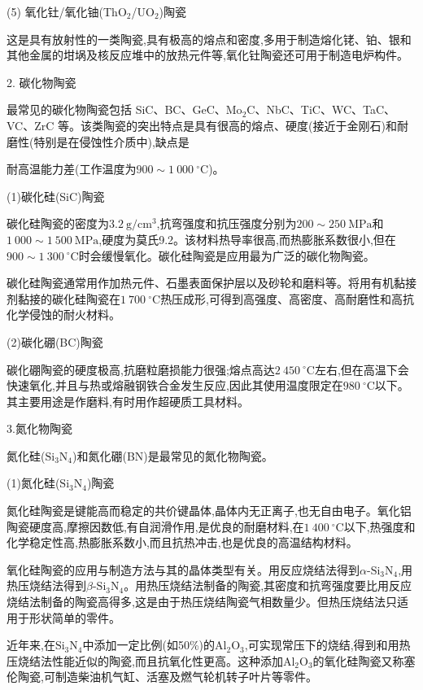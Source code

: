 \documentclass[UTF8]{ctexbook}
\newcommand{\◎}{\ensuremath{\bigcirc}}
\begin{document}
(5) 氧化钍/氧化铀(ThO$_2$/UO$_2$)陶瓷

这是具有放射性的一类陶瓷,具有极高的熔点和密度,多用于制造熔化铑、铂、银和其他金属的坩埚及核反应堆中的放热元件等,氧化钍陶瓷还可用于制造电炉构件。

2. 碳化物陶瓷

最常见的碳化物陶瓷包括 SiC、BC、GeC、Mo$_2$C、NbC、TiC、WC、TaC、VC、ZrC 等。该类陶瓷的突出特点是具有很高的熔点、硬度(接近于金刚石)和耐磨性(特别是在侵蚀性介质中),缺点是

耐高温能力差(工作温度为$900\sim1~000~^\circ\mathrm{C}$)。

(1)碳化硅(SiC)陶瓷

碳化硅陶瓷的密度为$3.2~\mathrm{g/cm^3}$,抗弯强度和抗压强度分别为$200\sim250~\mathrm{MPa}$和$1~000\sim1~500~\mathrm{MPa}$,硬度为莫氏9.2。该材料热导率很高,而热膨胀系数很小,但在$900\sim1~300~^\circ\mathrm{C}$时会缓慢氧化。碳化硅陶瓷是应用最为广泛的碳化物陶瓷。

碳化硅陶瓷通常用作加热元件、石墨表面保护层以及砂轮和磨料等。将用有机黏接剂黏接的碳化硅陶瓷在$1~700~^\circ\mathrm{C}$热压成形,可得到高强度、高密度、高耐磨性和高抗化学侵蚀的耐火材料。

(2)碳化硼(BC)陶瓷

碳化硼陶瓷的硬度极高,抗磨粒磨损能力很强;熔点高达$2~450~^\circ\mathrm{C}$左右,但在高温下会快速氧化,并且与热或熔融钢铁合金发生反应,因此其使用温度限定在$980~^\circ\mathrm{C}$以下。其主要用途是作磨料,有时用作超硬质工具材料。

3.氮化物陶瓷

氮化硅($\mathrm{Si_3N_4}$)和氮化硼(BN)是最常见的氮化物陶瓷。

(1)氮化硅($\mathrm{Si_3N_4}$)陶瓷

氮化硅陶瓷是键能高而稳定的共价键晶体,晶体内无正离子,也无自由电子。氧化铝陶瓷硬度高,摩擦因数低,有自润滑作用,是优良的耐磨材料,在$1~400~^\circ\mathrm{C}$以下,热强度和化学稳定性高,热膨胀系数小,而且抗热冲击,也是优良的高温结构材料。

氧化硅陶瓷的应用与制造方法与其的晶体类型有关。用反应烧结法得到$\alpha\text{-}\mathrm{Si_3N_4}$,用热压烧结法得到$\beta\text{-}\mathrm{Si_3N_4}$。用热压烧结法制备的陶瓷,其密度和抗弯强度要比用反应烧结法制备的陶瓷高得多,这是由于热压烧结陶瓷气相数量少。但热压烧结法只适用于形状简单的零件。

近年来,在$\mathrm{Si_3N_4}$中添加一定比例(如50\%)的$\mathrm{Al_2O_3}$,可实现常压下的烧结,得到和用热压烧结法性能近似的陶瓷,而且抗氧化性更高。这种添加$\mathrm{Al_2O_3}$的氧化硅陶瓷又称塞伦陶瓷,可制造柴油机气缸、活塞及燃气轮机转子叶片等零件。
\end{document}
